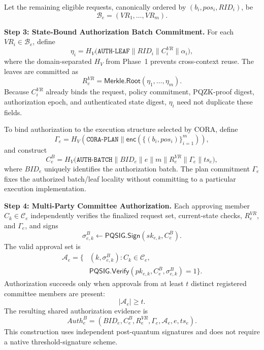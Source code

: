 \documentclass[lettersize,journal]{IEEEtran}
\begin{document}
Let the remaining eligible requests, canonically ordered by
$(b_i,pos_i,RID_i)$, be
\begin{equation}
\mathcal{B}_e=(VR_1,\ldots,VR_m).
\end{equation}

\medskip
\noindent\textbf{Step 3: State-Bound Authorization Batch Commitment.}
For each $VR_i\in\mathcal{B}_e$, define
\begin{equation}
\eta_i
=
H_V\big(
\texttt{AUTH-LEAF}\parallel
RID_i\parallel C_i^{VR}\parallel
\alpha_i
\big),
\end{equation}
where the domain-separated $H_V$ from Phase~1 prevents
cross-context reuse. The leaves are committed as
\begin{equation}
R_e^{VR}
=
\mathsf{Merkle.Root}
(\eta_1,\ldots,\eta_m).
\end{equation}
Because $C_i^{VR}$ already binds the request, policy commitment,
PQZK-proof digest, authorization epoch, and authenticated state digest,
$\eta_i$ need not duplicate these fields.

To bind authorization to the execution structure selected by CORA,
define
\begin{equation}
\Gamma_e=
H_V\!\left(
\texttt{CORA-PLAN}\parallel
\mathsf{enc}
\left(
\{(b_i,pos_i)\}_{i=1}^{m}
\right)
\right),
\end{equation}
and construct
\begin{equation}
C_e^{B}
=
H_V\big(
\texttt{AUTH-BATCH}\parallel
BID_e\parallel e\parallel m\parallel
R_e^{VR}\parallel\Gamma_e\parallel ts_e
\big),
\end{equation}
where $BID_e$ uniquely identifies the authorization batch.
The plan commitment $\Gamma_e$ fixes the authorized batch/leaf
locality without committing to a particular execution implementation.

\medskip
\noindent\textbf{Step 4: Multi-Party Committee Authorization.}
Each approving member $C_k\in\mathcal{C}_e$ independently verifies the
finalized request set, current-state checks, $R_e^{VR}$, and
$\Gamma_e$, and signs
\begin{equation}
\sigma_{e,k}^{B}
\leftarrow
\mathsf{PQSIG.Sign}
\left(
sk_{e,k},C_e^{B}
\right).
\end{equation}
The valid approval set is
\begin{equation}
\begin{aligned}
\mathcal{A}_e=\big\{&
(k,\sigma_{e,k}^{B}):
C_k\in\mathcal{C}_e,\\
&
\mathsf{PQSIG.Verify}
(pk_{e,k},C_e^{B},\sigma_{e,k}^{B})=1
\big\}.
\end{aligned}
\end{equation}
Authorization succeeds only when approvals from at least $t$ distinct
registered committee members are present:
\begin{equation}
|\mathcal{A}_e|\geq t.
\end{equation}
The resulting shared authorization evidence is
\begin{equation}
Auth_e^{B}
=
(BID_e,C_e^{B},R_e^{VR},\Gamma_e,
\mathcal{A}_e,e,ts_e).
\end{equation}
This construction uses independent post-quantum signatures and does not
require a native threshold-signature scheme.
\end{document}
